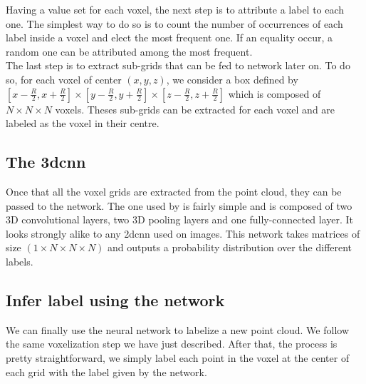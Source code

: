 Having a value set for each voxel, the next step is to attribute a label to each one. The simplest way to do so is to count the number of occurrences of each label inside a voxel and elect the most frequent one. If an equality occur, a random one can be attributed among the most frequent.\\

The last step is to extract sub-grids that can be fed to network later on. To do so, for each voxel of center \((x, y, z)\), we consider a box defined by \([x - \frac{R}{2}, x + \frac{R}{2}] \times [y - \frac{R}{2}, y + \frac{R}{2}] \times [z - \frac{R}{2}, z + \frac{R}{2}]\) which is composed of \(N \times N \times N\) voxels. Theses sub-grids can be extracted for each voxel and are labeled as the voxel in their centre.

\subsection{The \gls{3dcnn}}

Once that all the voxel grids are extracted from the point cloud, they can be passed to the network. The one used by \citeauthor*{7900038} is fairly simple and is composed of two 3D convolutional layers, two 3D pooling layers and one fully-connected layer. It looks strongly alike to any \gls{2dcnn} used on images. This network takes matrices of size \((1 \times N \times N \times N)\) and outputs a probability distribution over the different labels.

\subsection{Infer label using the network}

We can finally use the neural network to labelize a new point cloud. We follow the same voxelization step we have just described. After that, the process is pretty straightforward, we simply label each point in the voxel at the center of each grid with the label given by the network.
